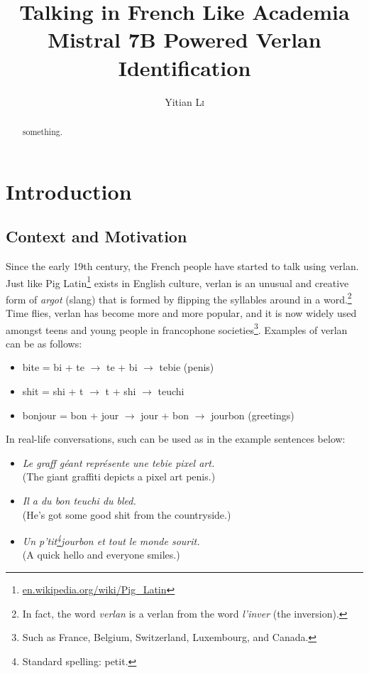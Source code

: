 \documentclass[12pt]{article}
\title{Talking in French Like Academia\\\large Mistral 7B Powered Verlan Identification}
\author{Yitian \textsc{Li}}
\begin{document}
\maketitle

\begin{abstract}
something.
\end{abstract}

\section{Introduction}
\subsection{Context and Motivation}

Since the early 19th century, the French people have started to talk using verlan. Just like Pig Latin\footnote{\url{en.wikipedia.org/wiki/Pig_Latin}} exists in English culture, verlan is an unusual and creative form of \textit{argot} (slang) that is formed by flipping the syllables around in a word.\footnote{In fact, the word \textit{verlan} is a verlan from the word \textit{l'inver} (the inversion).}\cite{rajabov2025,bach2018} 
Time flies, verlan has become more and more popular, and it is now widely used amongst teens and young people in francophone societies\footnote{Such as France, Belgium, Switzerland, Luxembourg, and Canada.}\cite{evolutionverlan}. Examples of verlan can be as follows:

\begin{flushleft}
\small
\begin{itemize}
  \item bite = bi + te \(\rightarrow\) te + bi \(\rightarrow\) tebie (penis)
  \item shit = shi + t \(\rightarrow\) t + shi \(\rightarrow\) teuchi\cite{evolutionverlan}
  \item bonjour = bon + jour \(\rightarrow\) jour + bon \(\rightarrow\) jourbon (greetings)
\end{itemize}
\end{flushleft}

\noindent In real-life conversations, such can be used as in the example sentences below:

\begin{flushleft}
\small
\begin{itemize}
  \item \textit{Le graff géant représente une tebie pixel art.}\\(The giant graffiti depicts a pixel art penis.)
  \item \textit{Il a du bon teuchi du bled.}\\(He's got some good shit from the countryside.)
  \item \textit{Un p'tit\footnote{Standard spelling: petit.}jourbon et tout le monde sourit.}\\(A quick hello and everyone smiles.)
\end{itemize}
\end{flushleft}
\end{document}
